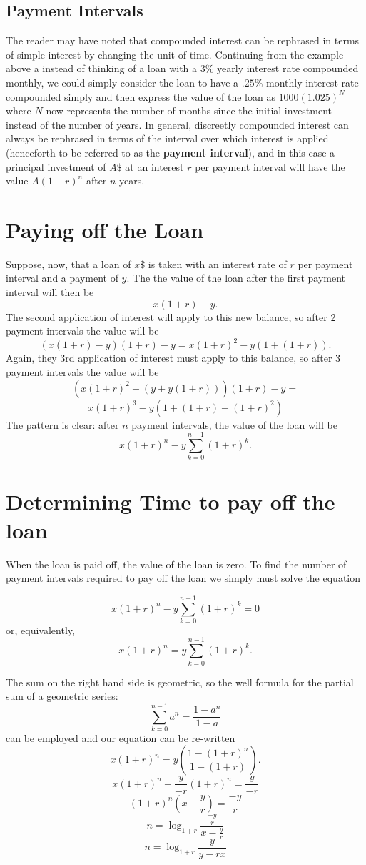 \documentclass[11pt]{article} %
\begin{document}
\subsection{Payment Intervals}
The reader may have noted that compounded interest can be rephrased in terms of simple interest by changing the unit of time.  Continuing from the example above a instead of thinking of a loan with a $3\%$ yearly interest rate compounded monthly, we could simply consider the loan to have a $.25\%$ monthly interest rate compounded simply and then express the value of the loan as $1000(1.025)^{N}$ where $N$ now represents the number of months since the initial investment instead of the number of years. In general, discreetly compounded interest can always be rephrased in terms of the interval over which interest is applied (henceforth to be referred to as the {\bf payment interval}),  and in this case a principal investment of $A\$$ at an interest $r$ per payment interval will have the value $A(1+r)^n$ after $n$ years.

\section{Paying off the Loan}
Suppose, now, that a loan of $x\$$ is taken with an interest rate of $r$ per payment interval and a payment of $y$. The the value of the loan after the first payment interval will then be 
$$x(1+r) - y.$$
The second application of interest will apply to this new balance, so after 2 payment intervals the value will be 
$$(x(1+r)-y)(1+r) - y = x(1+r)^{2} - y(1 + (1+r)).$$
Again, they 3rd application of interest must apply to this balance, so after 3 payment intervals the value will be
$$\left(x(1+r)^{2} - (y + y(1+r))\right)(1+r) -y =$$
$$ x(1+r)^{3} - y\left(1 + (1+r) + (1+r)^{2}\right)$$
The pattern is clear:  after $n$ payment intervals, the value of the loan will be 
$$x(1+r)^n - y \sum_{k=0}^{n-1} (1+r)^{k}.$$

\section{Determining Time to pay off the loan}
When the loan is paid off, the value of the loan is zero. To find the number of payment intervals required to pay off the loan we simply must solve the equation

$$x(1+r)^n - y \sum_{k=0}^{n-1} (1+r)^{k} = 0$$
or, equivalently, 
$$x(1+r)^n = y \sum_{k=0}^{n-1} (1+r)^{k}.$$

The sum on the right hand side is geometric, so the well formula for the partial sum of a geometric series:
$$\sum_{k=0}^{n-1} a^{n} = \frac{1-a^{n}}{1-a}$$ can be employed and our equation can be re-written
$$x(1+r)^n = y \left(\frac {1 - (1+r)^{n}}{1 - (1+r)} \right).$$
$$x(1+r)^n + \frac{y}{-r}(1+r)^{n} = \frac{y}{-r}$$
$$ (1+r)^{n} (x - \frac{y}{r}) = \frac{-y}{r}$$
$$n = \log_{1+r} \frac{\frac{-y}{r}}{x - \frac{y}{r}}$$
$$n = \log_{1+r} \frac{y}{y - rx}$$
\end{document}

